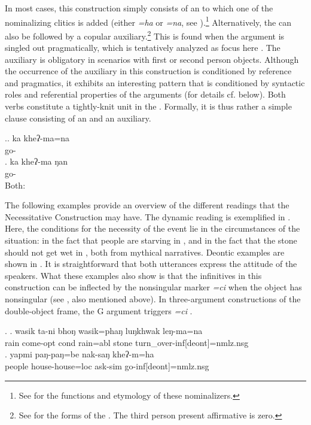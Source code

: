 In most cases, this construction simply consists of an   to which one of the nominalizing clitics is added (either \emph{=ha} or \emph{=na}, see \Next[a]).\footnote{See  for the functions and etymology of these nominalizers.}  Alternatively, the  can also be followed by a copular auxiliary.\footnote{See  for the forms of the . The third person present affirmative is zero.} This is found when the argument is singled out pragmatically, which is tentatively analyzed as focus here \Next[b]. The auxiliary is obligatory in scenarios with first or second person objects. Although the occurrence of the auxiliary in this construction is conditioned by reference and pragmatics, it exhibits an interesting  pattern that is conditioned by syntactic roles and referential properties of the arguments (for details cf. below). Both verbs constitute a tightly-knit unit in the . Formally,  it is thus rather a simple clause consisting of an  and an auxiliary. 

\ex.\ag. ka kheʔ-ma=na\\
 go- \\
\bg. ka kheʔ-ma ŋan\\
 go-  \\
Both:  


The following examples provide an overview of the different readings that the Necessitative Construction may have.
The dynamic reading is exemplified in \Next. Here, the conditions for the necessity of the event lie in the circumstances of the situation: in the fact that people are starving in \Next[a], and in the fact that the stone should not get wet in \Next[b], both from mythical narratives. Deontic examples are shown in \NNext. It is straightforward that both utterances express the attitude of the speakers. What these examples also show is that the infinitives in this construction can be inflected by the nonsingular marker \emph{=ci} when the object has nonsingular (see \NNext, also mentioned above). In three-argument constructions of the double-object frame, the G argument triggers   \emph{=ci}  \NNext[c].


\ex. \ag. wasik  ta-ni bhoŋ wasik=phaŋ luŋkhwak leŋ-ma=na\\
rain come{\sc [3sg]-opt} {\sc cond} rain{\sc =abl} stone turn\_over-{\sc inf[deont]=nmlz.nsg}\\
\bg. yapmi  paŋ-paŋ=be nak-saŋ kheʔ-m=ha\\
		people house-house{\sc=loc} ask-{\sc sim} go-{\sc inf[deont]=nmlz.nsg}\\
	 

